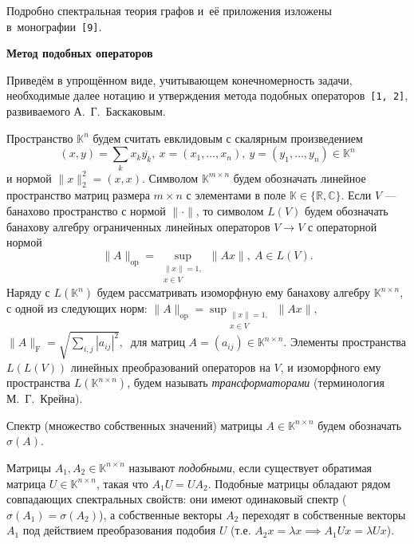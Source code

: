 \documentclass[12pt]{article}
\theoremstyle{definition}
\begin{document}
Подробно спектральная теория графов и~е\"е приложения
    изложены в~монографии~\texttt{[9]}.

\smallskip\textbf{Метод подобных операторов}\smallskip

Приведём в упрощённом виде, учитывающем конечномерность задачи,
    необходимые далее нотацию и утверждения
    метода подобных операторов~\texttt{[1, 2]},
    развиваемого А.~Г.~Баскаковым.


Пространство \( \mathbb{K}^n \)
    будем считать евклидовым с скалярным произведением
    \[
        (x, y){=}\sum_k x_k\overline{y_k},
        \ x{=}(x_1,\ldots, x_n),
        \ y=(y_1,\ldots, y_n)
        \in \mathbb{K}^n
        \]
    и нормой
    \(
        \|x\|_2^2{=}(x,x).
        \)
Символом \( \mathbb{K}^{m\times n} \)
    будем обозначать линейное пространство
    матриц размера \( m{\times}n \)
    с элементами в поле \( \mathbb{K}\in\{\mathbb{R},\mathbb{C}\} \).
Если \( V \) --- банахово пространство с нормой \( \|\cdot\| \),
    то символом \( L(V) \)
    будем обозначать банахову алгебру
    ограниченных линейных операторов \( V\to V \)
    с операторной нормой
\[
    \|A\|_{\mathrm{op}} = \sup_{\substack{\|x\|=1,\\ x\in V}} \|A x\|,\ A\in L(V).
    \]
Наряду с \( L(\mathbb{K}^n) \)
    будем рассматривать изоморфную ему
    банахову алгебру \( \mathbb{K}^{n\times n} \),
    с одной из следующих норм:
    \( \|A\|_{\mathrm{op}} = \sup_{\substack{\|x\|=1,\\ x\in V}} \|A x\|,\ \)
    \( \|A\|_{\mathrm{F}} = \sqrt{\sum_{i,j} |a_{ij}|^2},\ \)
    для матриц \( A{=}(a_{ij})\in\mathbb{K}^{n\times n} \).
Элементы пространства
    \( L(L(V)) \)
    линейных преобразований операторов на \( V \),
    и изоморфного ему пространства \( L(\mathbb{K}^{n\times n}) \),
    будем называть \emph{трансформаторами}
    (терминология М.~Г.~Крейна).

Спектр (множество собственных значений)
    матрицы \( A\in\mathbb{K}^{n\times n} \)
    будем обозначать \( \sigma(A) \).

Матрицы \( A_1, A_2 \in \mathbb{K}^{n\times n} \)
    называют \emph{подобными}, если существует
    обратимая матрица \( U\in\mathbb{K}^{n\times n} \),
    такая что \( A_1 U = U A_2 \).
Подобные матрицы обладают рядом совпадающих спектральных свойств:
    они имеют одинаковый спектр (\( \sigma(A_1)=\sigma(A_2) \)),
    а собственные векторы \( A_2 \) переходят
    в собственные векторы \( A_1 \) под действием
    преобразования подобия \( U \)
    (т.е. \( A_2 x = \lambda x \implies A_1 U x = \lambda U x \)).
\end{document}
